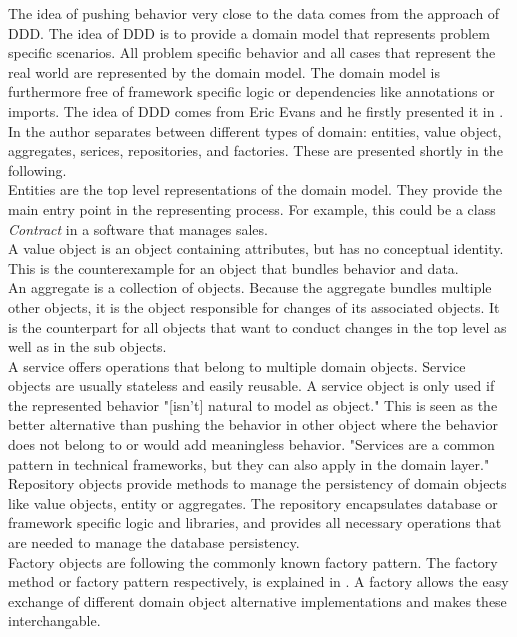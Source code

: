 The idea of pushing behavior very close to the data comes from the approach of \ac{DDD}. The idea of \ac{DDD} is to provide a domain model that represents problem specific scenarios. All problem specific behavior and all cases that represent the real world are represented by the domain model. The domain model is furthermore free of framework specific logic or dependencies like annotations or imports. The idea of \ac{DDD} comes from Eric Evans and he firstly presented it in \cite{dddbook}. 
In \cite{dddbook} the author separates between different types of domain: entities, value object, aggregates, serices, repositories, and factories. These are presented shortly in the following. 
\\

Entities are the top level representations of the domain model. They provide the main entry point in the representing process. For example, this could be a class \textit{Contract} in a software that manages sales. 
\\
A value object is an object containing attributes, but has no conceptual identity. This is the counterexample for an object that bundles behavior and data. 
\\
An aggregate is a collection of objects. Because the aggregate bundles multiple other objects, it is the object responsible for changes of its associated objects. It is the counterpart for all objects that want to conduct changes in the top level as well as in the sub objects. 
\\
A service offers operations that belong to multiple domain objects. Service objects are usually stateless and easily reusable. A service object is only used if the represented behavior "[isn't] natural to model as object." \cite[p. 103]{dddbook} This is seen as the better alternative than pushing the behavior in other object where the behavior does not belong to or would add meaningless behavior. "Services are a common pattern in technical frameworks, but they can also apply in the domain layer." \cite[p. 103]{dddbook}
\\
Repository objects provide methods to manage the persistency of domain objects like value objects, entity or aggregates. The repository encapsulates database or framework specific logic and libraries, and provides all necessary operations that are needed to manage the database persistency.
\\
Factory objects are following the commonly known factory pattern. The factory method or factory pattern respectively, is explained in \cite[p. 121]{gof}. A factory allows the easy exchange of different domain object alternative implementations and makes these interchangable.
